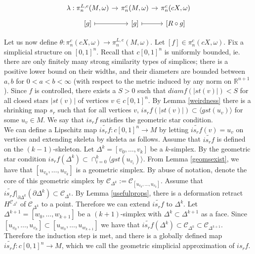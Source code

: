 \documentclass[a4paper,11pt]{article}
\theoremstyle{definition}
\theoremstyle{plain}
\theoremstyle{remark}
\begin{document}
{\begin{equation*}
	\begin{tikzcd}[row sep=0.5em, column sep=0.9em]
		\lambda: \pi^{L,e}_{n}(M,\omega)  \arrow[r] & \pi_{n}^c(M,\omega)  \arrow[r] & \pi_{n}^c(cX,\omega) \\
		{[g]} \arrow[r,|->] & {[g]} \arrow[r,|->]& {[R\circ g]} 
	\end{tikzcd}
\end{equation*}

Let us now define $\theta: \pi_n ^{c}(cX,\omega)\rightarrow  \pi^{L,e}_{n}(M,\omega)$. Let $[f]\in \pi_n^c(cX,\omega)$. Fix a simplicial structure on $[0,1]^n$. Recall that $c[0,1]^n$ is uniformly bounded, ie. there are only finitely many strong similarity types of simplices; there is a positive lower bound on their widths, and their diameters are bounded between $a,b$ for $0<a< b<\infty$ (with respect to the metric induced by any norm on $\mathbb{R}^{n+1}$). Since $f$ is controlled, there exists a $S>0$ such that $diam f (|st(v)|) < S$ for all closed stars $|st(v)|$ of vertices $v \in c[0,1]^n$. By Lemma \ref{weirdness} there is a shrinking map $s_{r}$ such that for all vertices $v$, $is_{r}  f (|st(v)|)\subset \langle gst(u_v) \rangle$ for some $u_v \in M$. We say that $is_{r}f$ satisfies the geometric star condition. \\

We can define a Lipschitz map $\widetilde{is_{r}f}: c[0,1]^n \rightarrow M$ by letting $\widetilde{is_{r}f}(v)=u_v$ on vertices and extending skeleta by skeleta as follows. Assume that $\widetilde{is_{r}f}$ is defined on the $(k-1)$-skeleton. Let $\Delta^{k}=[v_0,\dots,v_k]$ be a $k$-simplex. By the geometric star condition $is_{r}f(\Delta^{k})\subset \cap_{i=0}^{k} \langle gst(u_{v_{i}}) \rangle$. From Lemma \ref{geomsexist}, we have that $[u_{v_{0}}, \dots, u_{v_{k}}]$ is a geometric simplex. By abuse of notation, denote the core of this geometric simplex by $\mathscr{C}_{\Delta^{k}}:= \mathscr{C}_{[u_{v_{0}}, \dots, u_{v_{k}}]}$. Assume that $\widetilde{is_{r}f}|_{\partial \Delta^{k}}(\partial \Delta^k) \subset \mathscr{C}_{\Delta^{k}}$. By Lemma \ref{usefulprops}, there is a deformation retract $H^{\mathscr{C}_{\Delta^{k}}}$ of $\mathscr{C}_{\Delta^{k}}$ to a point. Therefore we can extend $\widetilde{is_{r}f}$ to $\Delta^k$. Let $\Delta^{k+1} = [w_0,\dots,w_{k+1}]$ be a $(k+1)$-simplex with $\Delta^k \subset \Delta^{k+1}$ as a face. Since $[u_{v_{0}}, \dots, u_{v_{k}}]\subset [u_{w_0},\dots,u_{w_{k+1}}]$ we have that $\widetilde{is_{r}f}(\Delta^k)\subset \mathscr{C}_{\Delta^k} \subset \mathscr{C}_{\Delta^{k+1}}$. Therefore the induction step is met, and there is a globally defined map $\widetilde{is_{r}f}: c[0,1]^n \rightarrow M$, which we call the geometric simplicial approximation of $is_{r}f$. \\

}
\end{document}
